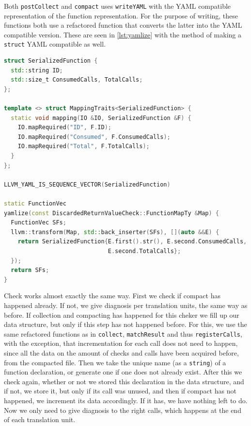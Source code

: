 Both \texttt{postCollect} and \texttt{compact} uses \texttt{writeYAML} with the YAML compatible representation of the function representation. For the
purpose of writing, these functions both use a refactored function that converts the latter into the YAML compatible version. These are seen in
\cref{lst:yamlize} with the method of making a \lstinline{struct} YAML compatible as well.

\begin{lstlisting}[language={C++},caption={Steps for making the data YAML writable.},label={lst:yamlize}]
struct SerializedFunction {
  std::string ID;
  std::size_t ConsumedCalls, TotalCalls;
};

template <> struct MappingTraits<SerializedFunction> {
  static void mapping(IO &IO, SerializedFunction &F) {
    IO.mapRequired("ID", F.ID);
    IO.mapRequired("Consumed", F.ConsumedCalls);
    IO.mapRequired("Total", F.TotalCalls);
  }
};

LLVM_YAML_IS_SEQUENCE_VECTOR(SerializedFunction)

static FunctionVec
yamlize(const DiscardedReturnValueCheck::FunctionMapTy &Map) {
  FunctionVec SFs;
  llvm::transform(Map, std::back_inserter(SFs), [](auto &&E) {
    return SerializedFunction{E.first().str(), E.second.ConsumedCalls,
                              E.second.TotalCalls};
  });
  return SFs;
}
\end{lstlisting}

Check works almost exactly the same way. First we check if compact has happened already. If not, we give diagnosis per translation units, the same
way as before. If collection and compacting has happened for this cheker we fill up our data structure, but only if this step has not happened before.
For this, we use the same refactored functions as in \texttt{collect}, \texttt{matchResult} and thus \texttt{registerCalls}, with the exception,
that incrementation for each call does not need to happen, since all the data on the amount of checks and calls have been acquired before,
from the compacted file. Then we take the unique name (as a \lstinline{string}) of a function
declaration, or generate one if one does not already exist. After this we check again, whether or not we stored this declaration in the data structure,
and if not, we store it, but only if its call was unused, and then if compact has not happened, we increment its data accordingly. If it
has, we have nothing left to do. Now we only need to give diagnosis to the right calls, which happens at the end of each translation unit.

